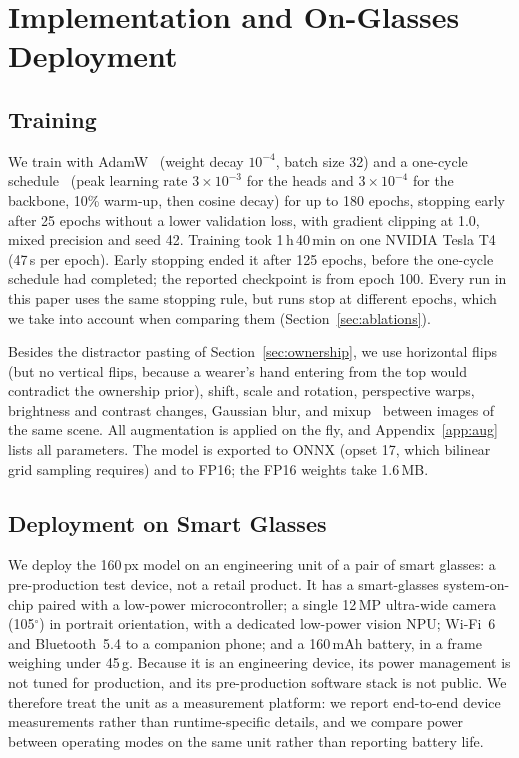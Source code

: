 \section{Implementation and On-Glasses Deployment}\label{sec:impl}

\subsection{Training}
We train with AdamW~\cite{loshchilov2019decoupled} (weight decay $10^{-4}$, batch size 32) and a one-cycle schedule~\cite{smith2019super} (peak learning rate $3\times10^{-3}$ for the heads and $3\times10^{-4}$ for the backbone, 10\% warm-up, then cosine decay) for up to 180 epochs, stopping early after 25 epochs without a lower validation loss, with gradient clipping at 1.0, mixed precision and seed 42. Training took 1\,h\,40\,min on one NVIDIA Tesla T4 (47\,s per epoch). Early stopping ended it after 125 epochs, before the one-cycle schedule had completed; the reported checkpoint is from epoch 100. Every run in this paper uses the same stopping rule, but runs stop at different epochs, which we take into account when comparing them (Section~\ref{sec:ablations}).

Besides the distractor pasting of Section~\ref{sec:ownership}, we use horizontal flips (but no vertical flips, because a wearer's hand entering from the top would contradict the ownership prior), shift, scale and rotation, perspective warps, brightness and contrast changes, Gaussian blur, and mixup~\cite{zhang2018mixup} between images of the same scene. All augmentation is applied on the fly, and Appendix~\ref{app:aug} lists all parameters. The model is exported to ONNX (opset 17, which bilinear grid sampling requires) and to FP16; the FP16 weights take 1.6\,MB.

\subsection{Deployment on Smart Glasses}\label{sec:device}
We deploy the 160\,px model on an engineering unit of a pair of smart glasses: a pre-production test device, not a retail product. It has a smart-glasses system-on-chip paired with a low-power microcontroller; a single 12\,MP ultra-wide camera (105$^\circ$) in portrait orientation, with a dedicated low-power vision NPU; Wi-Fi~6 and Bluetooth~5.4 to a companion phone; and a 160\,mAh battery, in a frame weighing under 45\,g. Because it is an engineering device, its power management is not tuned for production, and its pre-production software stack is not public. We therefore treat the unit as a measurement platform: we report end-to-end device measurements rather than runtime-specific details, and we compare power between operating modes on the same unit rather than reporting battery life.

